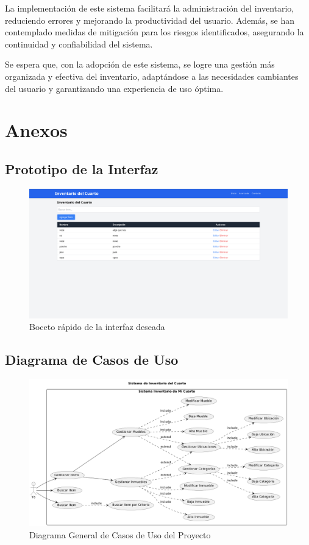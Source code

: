 \documentclass{article}
\begin{document}
La implementación de este sistema facilitará la administración del inventario, reduciendo errores y mejorando la productividad del usuario. Además, se han contemplado medidas de mitigación para los riesgos identificados, asegurando la continuidad y confiabilidad del sistema.

Se espera que, con la adopción de este sistema, se logre una gestión más organizada y efectiva del inventario, adaptándose a las necesidades cambiantes del usuario y garantizando una experiencia de uso óptima.

\newpage
\section{Anexos}
\subsection{Prototipo de la Interfaz}
\begin{figure}[H]
    \center
    \includegraphics[width=\textwidth]{img/image1.png}
    \caption{Boceto rápido de la interfaz deseada}
\end{figure}

\subsection{Diagrama de Casos de Uso}
\begin{figure}[H]
    \center
    \includegraphics[width=\textwidth]{img/image.png}
    \caption{Diagrama General de Casos de Uso del Proyecto}
\end{figure}
\end{document}

